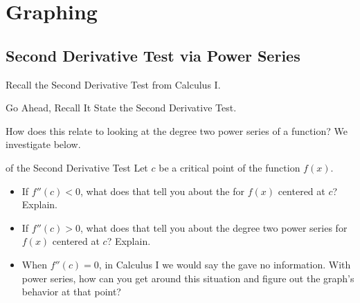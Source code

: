 \section{Graphing }
\subsection{Second Derivative Test via Power Series}
Recall the Second Derivative Test from Calculus I.  
\begin{exercise}{Go Ahead, Recall It \Coffeecup}
State the Second Derivative Test. \vspace*{1in}
\end{exercise}

How does this relate to looking at the degree two power series of a function?  We investigate below.
\begin{exercise}{ of the Second Derivative Test \Coffeecup \Coffeecup}
Let $c$ be a critical point of the function $f(x)$. 
\begin{itemize}
\item If $f''(c)<0$, what does that tell you about the  for $f(x)$ centered at $c$? Explain. \vspace*{1in}
\item If $f''(c)>0$, what does that tell you about the degree two power series for $f(x)$ centered at $c$? Explain.  \vspace*{1in}
\item When $f''(c)=0$, in Calculus I we would say the  gave no information.  With power series, how can you get around this situation and figure out the graph's behavior at that point?  \vspace*{1in}
\end{itemize}
\end{exercise}

